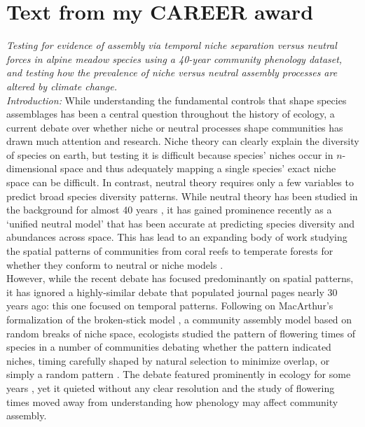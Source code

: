 \documentclass[11pt,a4paper]{article}
\begin{document}
\section{Text from my CAREER award}

\emph{Testing for evidence of assembly via temporal niche separation versus neutral forces in alpine meadow species using a 40-year community phenology dataset, and testing how the prevalence of niche versus neutral assembly processes are altered by climate change.}\\

\emph{Introduction:} While understanding the fundamental controls that shape species assemblages has been a central question throughout the history of ecology, a current debate over whether niche or neutral processes shape communities has drawn much attention and research. Niche theory can clearly explain the diversity of species on earth, but testing it is difficult because species' niches occur in \(n\)-dimensional space \citep{Hutchinson:1959xi} and thus adequately mapping a single species' exact niche space can be difficult. In contrast, neutral theory requires only a few variables to predict broad species diversity patterns. While neutral theory has been studied in the background for almost 40 years \citep{Watterson:1974gk,Caswell:1976np}, it has gained prominence recently as a `unified neutral model' \citep{Hubbell:2001vo} that has been accurate at predicting species diversity and abundances across space. This has lead to an expanding body of work studying the spatial patterns of communities from coral reefs to temperate forests for whether they conform to neutral or niche models \citep{Volkov:2007xt,Vergnon:2009bh}. \\

However, while the recent debate has focused predominantly on spatial patterns, it has ignored a highly-similar debate that populated journal pages nearly 30 years ago: this one focused on temporal patterns. Following on MacArthur's formalization of the broken-stick model \citep{MACARTHUR:1957gf}, a community assembly model based on random breaks of niche space, ecologists studied the pattern of flowering times of species in a number of communities debating whether the pattern indicated niches, timing carefully shaped by natural selection to minimize overlap, or simply a random pattern \citep{Cole:1981il}. The debate featured prominently in ecology for some years \citep{Gleeson:1981wh,Fleming:1984hu}, yet it quieted without any clear resolution and the study of flowering times moved away from understanding how phenology may affect community assembly.\\
\end{document}
